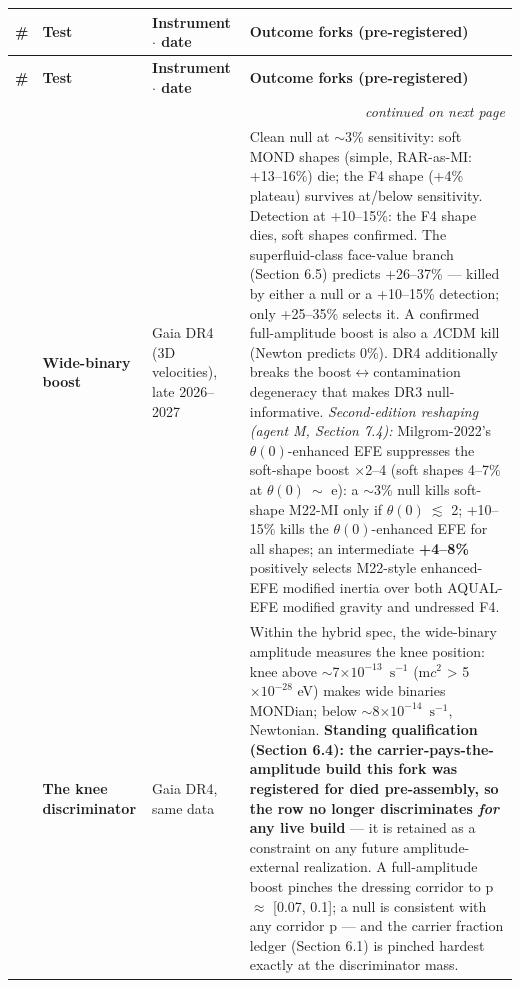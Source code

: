 \documentclass[11pt,a4paper]{article}
\begin{document}
\begin{longtable}{@{}c >{\raggedright\arraybackslash}p{2.1cm} >{\raggedright\arraybackslash}p{2.9cm} p{9.0cm}@{}}
\toprule
\textbf{\#} & \textbf{Test} & \textbf{Instrument $\cdot$ date} & \textbf{Outcome forks (pre-registered)} \\
\midrule
\endfirsthead
\toprule
\textbf{\#} & \textbf{Test} & \textbf{Instrument $\cdot$ date} & \textbf{Outcome forks (pre-registered)} \\
\midrule
\endhead
\midrule \multicolumn{4}{r}{\emph{continued on next page}} \\
\endfoot
\bottomrule
\endlastfoot
1 & \textbf{Wide-binary boost} & Gaia DR4 (3D velocities), late 2026--2027 & Clean null at $\sim$3\% sensitivity: soft MOND shapes (simple, RAR-as-MI: +13--16\%) die; the F4 shape (+4\% plateau) survives at/below sensitivity. Detection at +10--15\%: the F4 shape dies, soft shapes confirmed. The superfluid-class face-value branch (Section 6.5) predicts +26--37\% --- killed by either a null or a +10--15\% detection; only +25--35\% selects it. A confirmed full-amplitude boost is also a $\Lambda$CDM kill (Newton predicts 0\%). DR4 additionally breaks the boost$\leftrightarrow$contamination degeneracy that makes DR3 null-informative. \emph{Second-edition reshaping (agent M, Section 7.4):} Milgrom-2022's $\theta(0)$-enhanced EFE suppresses the soft-shape boost $\times$2--4 (soft shapes 4--7\% at $\theta(0)\ \sim$ e): a $\sim$3\% null kills soft-shape M22-MI only if $\theta(0)\ \lesssim$ 2; +10--15\% kills the $\theta(0)$-enhanced EFE for all shapes; an intermediate \textbf{+4--8\%} positively selects M22-style enhanced-EFE modified inertia over both AQUAL-EFE modified gravity and undressed F4. \\
\addlinespace
2 & \textbf{The knee discriminator} & Gaia DR4, same data & Within the hybrid spec, the wide-binary amplitude measures the knee position: knee above $\sim$7$\times10^{-13}$\ $\mathrm{s^{-1}}$ (m$c^{2}$ > 5$\times10^{-28}$ eV) makes wide binaries MONDian; below $\sim$8$\times10^{-14}$\ $\mathrm{s^{-1}}$, Newtonian. \textbf{Standing qualification (Section 6.4): the carrier-pays-the-amplitude build this fork was registered for died pre-assembly, so the row no longer discriminates \emph{for} any live build} --- it is retained as a constraint on any future amplitude-external realization. A full-amplitude boost pinches the dressing corridor to p $\approx$ [0.07, 0.1]; a null is consistent with any corridor p --- and the carrier fraction ledger (Section 6.1) is pinched hardest exactly at the discriminator mass. \\

\end{longtable}
\end{document}

